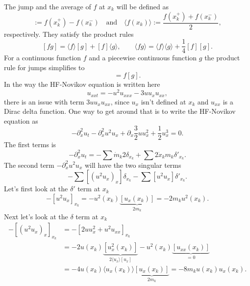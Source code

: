 \documentclass[english,master]{liumaiex}
\theoremstyle{plain}
\theoremstyle{definition}
\begin{document}
The jump and the average of $f$ at $x_k$ will be defined as
\begin{equation}
	[f(x_k)] := f(x_k^+) - f(x_k^-) \quad \text{and} \quad \langle f(x_k)\rangle := \frac{f(x_k^+) + f(x_k^-)}{2},
\end{equation}
respectively. They satisfy the product rules
\begin{equation} \label{eq:dirac_product_rules}
	[fg] = \langle f\rangle[g] + [f]\langle g\rangle, \quad \quad \langle fg\rangle = \langle f\rangle\langle g\rangle + \frac{1}{4}[f][g].
\end{equation}
%
For a continuous function $f$ and a piecewise continuous function $g$ the product rule for jumps simplifies to
\begin{equation}
	[fg] = f[g].
\end{equation}
In the way the HF-Novikov equation is written here
\begin{equation}
	u_{xxt} = -u^2u_{xxx} - 3uu_xu_{xx},
\end{equation}
there is an issue with term $3uu_xu_{xx}$, since $u_x$ isn't defined at $x_k$ and $u_{xx}$ is a Dirac delta function. One way to get around that is to write the HF-Novikov equation as
\begin{equation}
	-\partial_x^2 u_t - \partial_x^2 u^2 u_x + \partial_x \frac{3}{2} u u_x^2 + \frac{1}{2}u_x^3 = 0.
\end{equation}
%
The first terms is 
\begin{equation}
	-\partial_x^2 u_t = - \sum \dot{m}_k 2 \delta_{x_k} + \sum 2 \dot{x}_k m_k \delta'_{x_k}.
\end{equation}
%
The second term $-\partial_x^2 u^2 u_x$ will have the two singular terms
\begin{equation}
	- \sum [(u^2 u_x)_x] \delta_{x_k} - \sum [u^2 u_x] \delta'_{x_k}.
\end{equation}
%
Let's first look at the $\delta'$ term at $x_k$
\begin{equation}
	- [u^2 u_x]_{x_k} = - u^2(x_k) \underbrace{[u_x(x_k)]}_{2m_k} = -2 m_k u^2(x_k).
\end{equation}
Next let's look at the $\delta$ term at $x_k$
\begin{equation}
\begin{aligned}
	- [(u^2 u_x)_x]_{x_k} &= -[2u u_x^2 + u^2 u_{xx}]_{x_k} \\
		&= - 2u(x_k) \underbrace{[u_x^2(x_k)]}_{2\langle u_x \rangle [u_x]}
		- u^2(x_k) \underbrace{[u_{xx}(x_k)]}_{=0} \\
		&= -4u(x_k) \langle u_x(x_k) \rangle \underbrace{[u_x(x_k)]}_{2m_k} = -8m_k u(x_k) u_x(x_k).
\end{aligned}
\end{equation}
\end{document}
